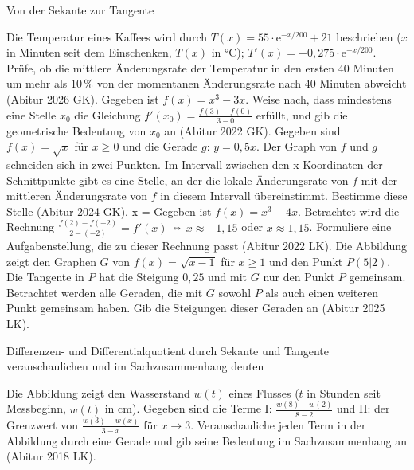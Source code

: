 \begin{aufgabe}{Von der Sekante zur Tangente}
\begin{teile}
\begin{ksys}[xmin=-1,xmax=3,ymin=-3,ymax=4,ablesen]\end{ksys}
\teil Die Temperatur eines Kaffees wird durch $T(x) = 55 \cdot \mathrm{e}^{-x/200} + 21$ beschrieben ($x$ in Minuten seit dem Einschenken, $T(x)$ in °C); $T'(x) = -0{,}275 \cdot \mathrm{e}^{-x/200}$. Prüfe, ob die mittlere Änderungsrate der Temperatur in den ersten 40 Minuten um mehr als $10\,\%$ von der momentanen Änderungsrate nach 40 Minuten abweicht \hfill (Abitur 2026 GK).
\teil Gegeben ist $f(x) = x^3 - 3x$. Weise nach, dass mindestens eine Stelle $x_0$ die Gleichung $f'(x_0) = \frac{f(3) - f(0)}{3 - 0}$ erfüllt, und gib die geometrische Bedeutung von $x_0$ an \hfill (Abitur 2022 GK).
\teil Gegeben sind $f(x) = \sqrt{x}$ für $x \ge 0$ und die Gerade $g$: $y = 0{,}5x$. Der Graph von $f$ und $g$ schneiden sich in zwei Punkten. Im Intervall zwischen den x-Koordinaten der Schnittpunkte gibt es eine Stelle, an der die lokale Änderungsrate von $f$ mit der mittleren Änderungsrate von $f$ in diesem Intervall übereinstimmt. Bestimme diese Stelle \hfill (Abitur 2024 GK). x = \leerfeld
\teil Gegeben ist $f(x) = x^3 - 4x$. Betrachtet wird die Rechnung $\frac{f(2) - f(-2)}{2 - (-2)} = f'(x)$ ⇔ $x \approx -1{,}15$ oder $x \approx 1{,}15$. Formuliere eine Aufgabenstellung, die zu dieser Rechnung passt \hfill (Abitur 2022 LK).
\teil Die Abbildung zeigt den Graphen $G$ von $f(x) = \sqrt{x - 1}$ für $x \ge 1$ und den Punkt $P(5 | 2)$. Die Tangente in $P$ hat die Steigung $0{,}25$ und mit $G$ nur den Punkt $P$ gemeinsam. Betrachtet werden alle Geraden, die mit $G$ sowohl $P$ als auch einen weiteren Punkt gemeinsam haben. Gib die Steigungen dieser Geraden an \hfill (Abitur 2025 LK).

\begin{ksys}[xmin=0,xmax=10,ymin=-1,ymax=4,ablesen]\end{ksys}
\end{teile}
\end{aufgabe}

\begin{aufgabe}{Differenzen- und Differentialquotient durch Sekante und Tangente veranschaulichen und im Sachzusammenhang deuten}
\begin{teile}
\teil Die Abbildung zeigt den Wasserstand $w(t)$ eines Flusses ($t$ in Stunden seit Messbeginn, $w(t)$ in cm). Gegeben sind die Terme I: $\frac{w(8) - w(2)}{8 - 2}$ und II: der Grenzwert von $\frac{w(3) - w(x)}{3 - x}$ für $x \to 3$. Veranschauliche jeden Term in der Abbildung durch eine Gerade und gib seine Bedeutung im Sachzusammenhang an \hfill (Abitur 2018 LK).

\begin{ksys}[xmin=0,xmax=12,ymin=0,ymax=60,xstep=1,ystep=10,xlabel=t in h,ylabel=w in cm,ablesen]\end{ksys}
\end{teile}
\end{aufgabe}


